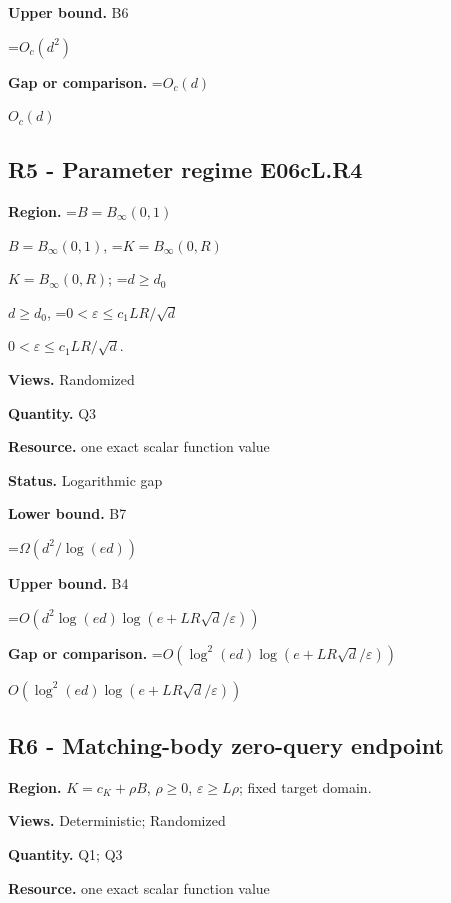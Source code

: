 \documentclass[10pt,a4paper]{article}
\newcommand{\AtlasMath}[1]{\par\begingroup\centering\setbox0=\hbox{$\displaystyle #1$}\ifdim\wd0>1.4\linewidth\typeout{ATLAS WIDE FORMULA: \the\wd0}\fi\ifdim\wd0>\linewidth\resizebox{\linewidth}{!}{\box0}\else\box0\fi\par\endgroup}
\newcommand{\AtlasInlineMath}[1]{\begingroup\setbox0=\hbox{$#1$}\ifdim\wd0>.4\linewidth\endgroup\AtlasMath{#1}\else\endgroup$#1$\fi}
\begin{document}
\textbf{Upper bound.} B6



\AtlasMath{O_c(d^2)}


\textbf{Gap or comparison.} \AtlasInlineMath{O_c(d)}



\subsection{R5 - Parameter regime E06cL.R4}


\textbf{Region.} \AtlasInlineMath{B=B_\infty(0,1)}, \AtlasInlineMath{K=B_\infty(0,R)}; \AtlasInlineMath{d\ge d_0}, \AtlasInlineMath{0<\varepsilon\le c_1LR/\sqrt d}.



\textbf{Views.} Randomized



\textbf{Quantity.} Q3



\textbf{Resource.} one exact scalar function value



\textbf{Status.} Logarithmic gap



\textbf{Lower bound.} B7



\AtlasMath{\Omega(d^2/\log(ed))}


\textbf{Upper bound.} B4



\AtlasMath{O(d^2\log(ed)\log(e+LR\sqrt d/\varepsilon))}


\textbf{Gap or comparison.} \AtlasInlineMath{O(\log^2(ed)\log(e+LR\sqrt d/\varepsilon))}



\subsection{R6 - Matching-body zero-query endpoint}


\textbf{Region.} $K=c_K+\rho B$, $\rho \ge 0$, $\varepsilon \ge L\rho$; fixed target domain.



\textbf{Views.} Deterministic; Randomized



\textbf{Quantity.} Q1; Q3



\textbf{Resource.} one exact scalar function value
\end{document}
